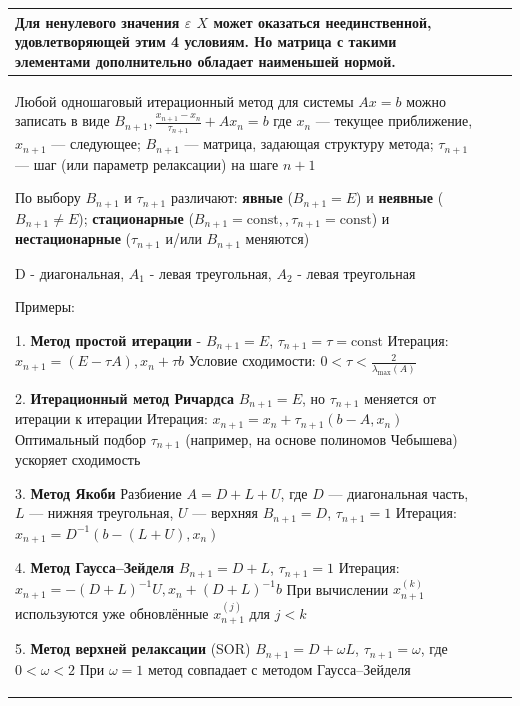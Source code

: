 \documentclass[a4paper,4pt]{article}
\begin{document}
\begin{tabular}{|>{\raggedright\arraybackslash}p{}
                |>{\raggedright\arraybackslash}p{}
                |>{\raggedright\arraybackslash}p{}|}
Для ненулевого значения $\varepsilon$ $X$ может оказаться неединственной, удовлетворяющей этим 4 условиям. Но матрица с такими элементами дополнительно обладает наименьшей нормой.
\\\hline

Любой одношаговый итерационный метод для системы $Ax = b$ можно записать в виде $B_{n+1},\frac{x_{n+1} - x_n}{\tau_{n+1}} + Ax_n = b$ где $x_n$ — текущее приближение, $x_{n+1}$ — следующее;  $B_{n+1}$ — матрица, задающая структуру метода;   $\tau_{n+1}$ — шаг (или параметр релаксации) на шаге $n+1$

По выбору $B_{n+1}$ и $\tau_{n+1}$ различают: \textbf{явные} ($B_{n+1} = E$) и \textbf{неявные} ($B_{n+1}\neq E$); \textbf{стационарные} ($B_{n+1}=\mathrm{const},,\tau_{n+1}=\mathrm{const}$) и \textbf{нестационарные} ($\tau_{n+1}$ и/или $B_{n+1}$ меняются)

D - диагональная, $A_1$ - левая треугольная, $A_2$ - левая треугольная

Примеры:

1. \textbf{Метод простой итерации}
- $B_{n+1}=E$, $\tau_{n+1}=\tau=\mathrm{const}$  Итерация: $x_{n+1} = (E - \tau A),x_n + \tau b$ Условие сходимости: $0 < \tau < \tfrac{2}{\lambda_{\max}(A)}$

2. \textbf{Итерационный метод Ричардса}
$B_{n+1}=E$, но $\tau_{n+1}$ меняется от итерации к итерации Итерация:  $x_{n+1} = x_n + \tau_{n+1}(b - A,x_n)$ Оптимальный подбор $\tau_{n+1}$ (например, на основе полиномов Чебышева) ускоряет сходимость

3. \textbf{Метод Якоби}
Разбиение $A = D + L + U$, где $D$ — диагональная часть, $L$ — нижняя треугольная, $U$ — верхняя $B_{n+1}=D$, $\tau_{n+1}=1$  Итерация:  $x_{n+1} = D^{-1}(b - (L+U),x_n)$

4. \textbf{Метод Гаусса–Зейделя}
$B_{n+1}=D + L$, $\tau_{n+1}=1$ Итерация: $x_{n+1} = -(D+L)^{-1}U,x_n + (D+L)^{-1}b$ При вычислении $x_{n+1}^{(k)}$ используются уже обновлённые $x_{n+1}^{(j)}$ для $j<k$

5. \textbf{Метод верхней релаксации}
(SOR) $B_{n+1} = D + \omega L$, $\tau_{n+1}=\omega$, где $0 < \omega < 2$ При $\omega = 1$ метод совпадает с методом Гаусса–Зейделя
&

\end{tabular}

\end{document}
